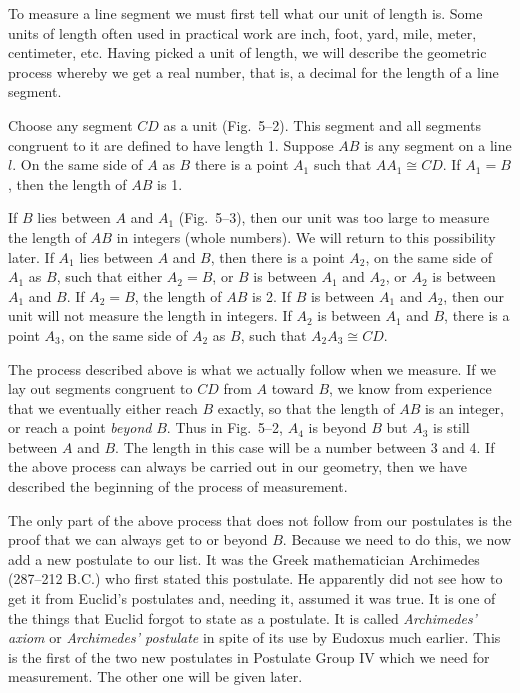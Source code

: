 \documentclass[11pt]{book}
\begin{document}
To measure a line segment we must first tell what our unit of length is. Some
units of length often used in practical work are inch, foot, yard, mile, meter,
centimeter, etc. Having picked a unit of length, we will describe the geometric
process whereby we get a real number, that is, a decimal for the length of a
line segment.

Choose any segment $CD$ as a unit (Fig.~5--2). This segment and all segments
congruent to it are defined to have length 1. Suppose $AB$ is any segment on a
line $l$. On the same side of $A$ as $B$ there is a point $A_1$ such that
$AA_1 \cong CD$. If $A_1 = B$, then the length of $AB$ is 1.

\FIGVTWO

\FIGVTHREE

\noindent If $B$ lies between $A$ and $A_1$ (Fig.~5--3), then our unit was too
large to measure the length of $AB$ in integers (whole numbers). We will return
to this possibility later. If $A_1$ lies between $A$ and $B$, then there is a
point $A_2$, on the same side of $A_1$ as $B$, such that either $A_2 = B$, or
$B$ is between $A_1$ and $A_2$, or $A_2$ is between $A_1$ and $B$. If
$A_2 = B$, the length of $AB$ is 2. If $B$ is between $A_1$ and $A_2$, then our
unit will not measure the length in integers. If $A_2$ is between $A_1$ and
$B$, there is a point $A_3$, on the same side of $A_2$ as $B$, such that
$A_2A_3 \cong CD$.

The process described above is what we actually follow when we measure. If we
lay out segments congruent to $CD$ from $A$ toward $B$, we know from experience
that we eventually either reach $B$ exactly, so that the length of $AB$ is an
integer, or reach a point \emph{beyond} $B$. Thus in Fig.~5--2, $A_4$ is beyond
$B$ but $A_3$ is still between $A$ and $B$. The length in this case will be a
number between 3 and 4. If the above process can always be carried out in our
geometry, then we have described the beginning of the process of measurement.

The only part of the above process that does not follow from our postulates is
the proof that we can always get to or beyond $B$. Because we need to do this,
we now add a new postulate to our list. It was the Greek mathematician
Archimedes (287--212 B.C.) who first stated this postulate. He apparently did
not see how to get it from Euclid's postulates and, needing it, assumed it was
true. It is one of the things that Euclid forgot to state as a postulate. It is
called \emph{Archimedes' axiom} or \emph{Archimedes' postulate} in spite of its
use by Eudoxus much earlier. This is the first of the two new postulates in
Postulate Group IV which we need for measurement. The other one will be given
later.
\end{document}
